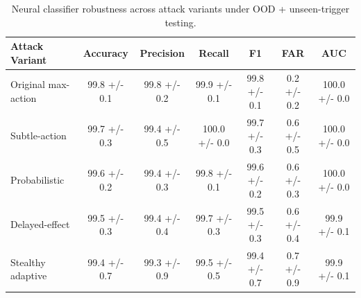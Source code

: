 \begin{table}[t]
\centering
\begin{tabular}{lcccccc}
\hline
Attack Variant & Accuracy & Precision & Recall & F1 & FAR & AUC \\
\hline
Original max-action & 99.8 +/- 0.1 & 99.8 +/- 0.2 & 99.9 +/- 0.1 & 99.8 +/- 0.1 & 0.2 +/- 0.2 & 100.0 +/- 0.0 \\
Subtle-action & 99.7 +/- 0.3 & 99.4 +/- 0.5 & 100.0 +/- 0.0 & 99.7 +/- 0.3 & 0.6 +/- 0.5 & 100.0 +/- 0.0 \\
Probabilistic & 99.6 +/- 0.2 & 99.4 +/- 0.3 & 99.8 +/- 0.1 & 99.6 +/- 0.2 & 0.6 +/- 0.3 & 100.0 +/- 0.0 \\
Delayed-effect & 99.5 +/- 0.3 & 99.4 +/- 0.4 & 99.7 +/- 0.3 & 99.5 +/- 0.3 & 0.6 +/- 0.4 & 99.9 +/- 0.1 \\
Stealthy adaptive & 99.4 +/- 0.7 & 99.3 +/- 0.9 & 99.5 +/- 0.5 & 99.4 +/- 0.7 & 0.7 +/- 0.9 & 99.9 +/- 0.1 \\
\hline
\end{tabular}
\caption{Neural classifier robustness across attack variants under OOD + unseen-trigger testing.}
\label{tab:attack_variant_robustness}
\end{table}
